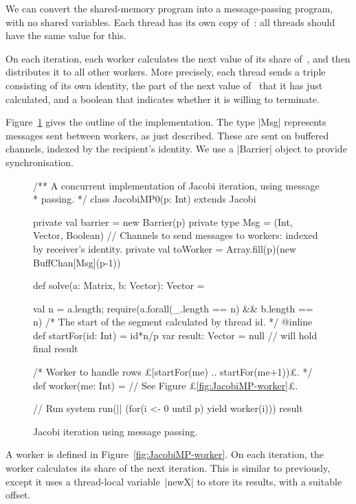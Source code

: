We can convert the shared-memory program into a message-passing program, with
no shared variables.  Each thread has its own copy of~: all threads
should have the same value for this.  

On each iteration, each worker calculates the next value of its share
of~, and then distributes it to all other workers.  More precisely,
each thread sends a triple consisting of its own identity, the part of the
next value of~ that it has just calculated, and a boolean that
indicates whether it is willing to terminate.  

Figure~\ref{fig:JacobiMP} gives the outline of the implementation.  The type
|Msg| represents messages sent between workers, as just described.  These are
sent on buffered channels, indexed by the recipient's identity.  We use a
|Barrier| object to provide synchronisation.


\begin{figure}
\begin{scala}
/** A concurrent implementation of Jacobi iteration, using message
  * passing. */
class JacobiMP0(p: Int) extends Jacobi{
  private val barrier = new Barrier(p)
  private type Msg = (Int, Vector, Boolean)
  // Channels to send messages to workers: indexed by receiver's identity.
  private val toWorker = Array.fill(p)(new BuffChan[Msg](p-1))

  def solve(a: Matrix, b: Vector): Vector = {
    val n = a.length; require(a.forall(_.length == n) && b.length == n)
    /* The start of the segment calculated by thread id. */
    @inline def startFor(id: Int) = id*n/p
    var result: Vector = null // will hold final result

    /* Worker to handle rows £[startFor(me) .. startFor(me+1))£. */
    def worker(me: Int) = // See Figure £\ref{fig:JacobiMP-worker}£.

    // Run system
    run(|| (for(i <- 0 until p) yield worker(i)))
    result
  }
}
\end{scala}
\caption{Jacobi iteration using message passing.}
\label{fig:JacobiMP}
\end{figure}


A worker is defined in Figure~\ref{fig:JacobiMP-worker}.  On each iteration,
the worker calculates its share of the next iteration.  This is similar to
previously, except it uses a thread-local variable~|newX| to store its
results, with a suitable offset.

